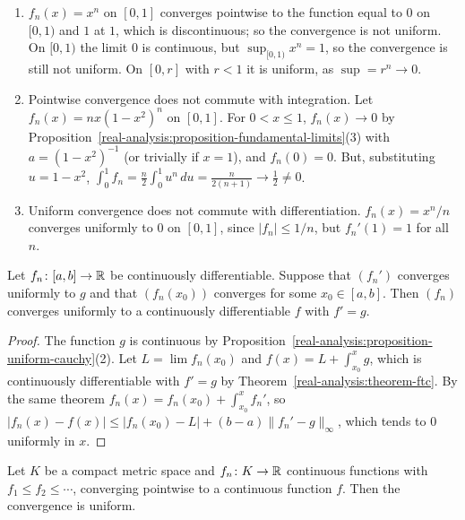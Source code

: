 \begin{counterexample}\label{real-analysis:counterexample-pointwise}
\begin{enumerate}
\item $f_n(x) = x^n$ on $[0, 1]$ converges pointwise to the function equal to $0$ on $[0, 1)$ and $1$ at $1$, which is discontinuous; so the convergence is not uniform. On $[0, 1)$ the limit $0$ is continuous, but
$\sup_{[0,1)}x^n = 1$, so the convergence is still not uniform. On $[0, r]$ with $r < 1$ it is uniform, as $\sup = r^n \to 0$.
\item Pointwise convergence does not commute with integration. Let $f_n(x) = nx(1 - x^2)^n$ on $[0, 1]$. For $0 < x \leq 1$, $f_n(x) \to 0$ by Proposition~\ref{real-analysis:proposition-fundamental-limits}(3) with $a = (1 - x^2)^{-1}$
(or trivially if $x = 1$), and $f_n(0) = 0$. But, substituting $u = 1 - x^2$, $\int_0^1f_n = \frac n2\int_0^1u^n\,du = \frac{n}{2(n + 1)} \to \frac12 \neq 0$.
\item Uniform convergence does not commute with differentiation. $f_n(x) = x^n/n$ converges uniformly to $0$ on $[0, 1]$, since $|f_n| \leq 1/n$, but $f_n'(1) = 1$ for all $n$.
\end{enumerate}
\end{counterexample}

\begin{theorem}\label{real-analysis:theorem-uniform-derivative}
Let $f_n \colon [a, b] \to \mathbb{R}$ be continuously differentiable. Suppose that $(f_n')$ converges uniformly to $g$ and that $(f_n(x_0))$ converges for some $x_0 \in [a, b]$. Then $(f_n)$ converges uniformly to a continuously
differentiable $f$ with $f' = g$.
\end{theorem}

\begin{proof}
The function $g$ is continuous by Proposition~\ref{real-analysis:proposition-uniform-cauchy}(2). Let $L = \lim f_n(x_0)$ and $f(x) = L + \int_{x_0}^xg$, which is continuously differentiable with $f' = g$ by
Theorem~\ref{real-analysis:theorem-ftc}. By the same theorem $f_n(x) = f_n(x_0) + \int_{x_0}^xf_n'$, so
$|f_n(x) - f(x)| \leq |f_n(x_0) - L| + (b - a)\|f_n' - g\|_\infty$, which tends to $0$ uniformly in $x$.
\end{proof}

\begin{theorem}[Dini]\label{real-analysis:theorem-dini}
Let $K$ be a compact metric space and $f_n \colon K \to \mathbb{R}$ continuous functions with $f_1 \leq f_2 \leq \cdots$, converging pointwise to a continuous function $f$. Then the convergence is uniform.
\end{theorem}

